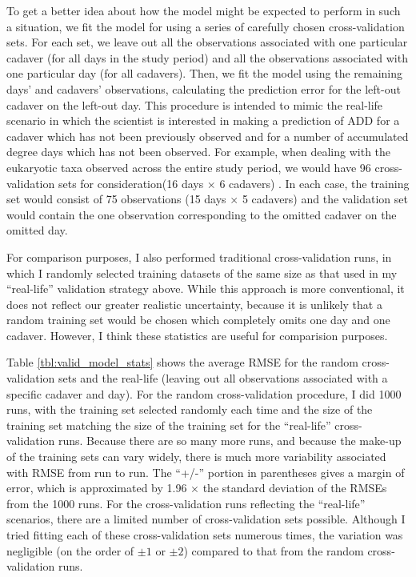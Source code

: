 \documentclass{article}
\begin{document}
To get a better idea about how the model might be expected to perform
in such a situation, we fit the model for using a series of carefully
chosen cross-validation sets.  For each set, we leave out all the
observations associated with one particular cadaver (for all days in
the study period) and all the observations associated with one
particular day (for all cadavers).  Then, we fit the model using the
remaining days' and cadavers' observations, calculating the prediction
error for the left-out cadaver on the left-out day.  This procedure is
intended to mimic the real-life scenario in which the scientist is
interested in making a prediction of ADD for a cadaver which has not
been previously observed and for a number of accumulated degree days
which has not been observed.  For example, when dealing with the
eukaryotic taxa observed across the entire study period, we would have
96 cross-validation sets for consideration(16 days $\times$ 6
cadavers) .  In each case, the training set would consist of 75
observations (15 days $\times$ 5 cadavers) and the validation set would
contain the one observation corresponding to the omitted cadaver on
the omitted day.

For comparison purposes, I also performed traditional cross-validation
runs, in which I randomly selected training datasets of the same size
as that used in my ``real-life'' validation strategy above.  While
this approach is more conventional, it does not reflect our greater
realistic uncertainty, because it is unlikely that a random training
set would be chosen which completely omits one day and one cadaver.
However, I think these statistics are useful for comparision
purposes.  

Table \ref{tbl:valid_model_stats} shows the average RMSE for the
random cross-validation sets and the real-life (leaving out all
observations associated with a specific cadaver and day).  For the
random cross-validation procedure, I did 1000 runs, with the training
set selected randomly each time and the size of the training set
matching the size of the training set for the ``real-life''
cross-validation runs.  Because there are so many more runs, and
because the make-up of the training sets can vary widely, there is
much more variability associated with RMSE from run to run.  The
``+/-'' portion in parentheses gives a margin of error, which is
approximated by 1.96 $\times$ the standard deviation of the RMSEs from
the 1000 runs.  For the cross-validation runs reflecting the
``real-life'' scenarios, there are a limited number of
cross-validation sets possible.  Although I tried fitting each of
these cross-validation sets numerous times, the variation was
negligible (on the order of $\pm 1$ or $\pm 2$) compared to that from
the random cross-validation runs.
\end{document}
